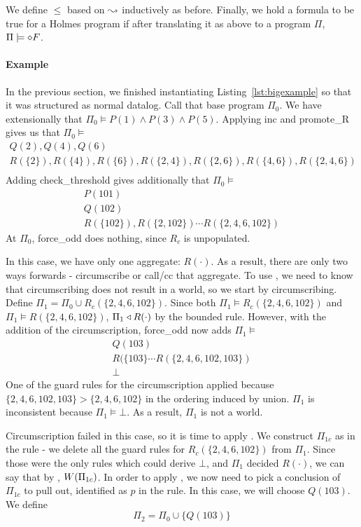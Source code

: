 We define $\leq$ based on $\leadsto$ inductively as before.
Finally, we hold a formula to be true for a Holmes program if after translating it as above to a program $\Pi$, $\Pi \models \diamond F$.

\paragraph{Example}
In the previous section, we finished instantiating Listing~\ref{lst:bigexample} so that it was structured as normal datalog.
Call that base program $\Pi_0$.
We have extensionally that $\Pi_0 \models P(1) \wedge P(3) \wedge P(5)$.
Applying inc and promote\_R gives us that $\Pi_0 \models$
\begin{align*}
	Q(2), Q(4), Q(6)\\
	R(\{2\}), R(\{4\}), R(\{6\}), R(\{2, 4\}), R(\{2, 6\}), R(\{4, 6\}), R(\{2, 4, 6\})\\
\end{align*}
Adding check\_threshold gives additionally that $\Pi_0 \models$
\begin{align*}
	P(101)\\
	Q(102)\\
	R(\{102\}), R(\{2, 102\}) \cdots R(\{2, 4, 6, 102\})
\end{align*}
At $\Pi_0$, force\_odd does nothing, since $R_c$ is unpopulated.

In this case, we have only one aggregate: $R(\cdot)$.
As a result, there are only two ways forwards - circumscribe or call/cc that aggregate.
To use , we need to know that circumscribing does not result in a world, so we start by circumscribing.
Define $\Pi_1 = \Pi_0 \cup R_c(\{2, 4, 6, 102\})$.
Since both $\Pi_1 \models R_c(\{2, 4, 6, 102\})$ and $\Pi_1 \models R(\{2, 4, 6, 102\})$, $\Pi_1 \triangleleft R(\cdot)$ by the bounded rule.
However, with the addition of the circumscription, force\_odd now adds $\Pi_1 \models$
\begin{align*}
	Q(103)\\
	R(\{103\} \cdots R(\{2, 4, 6, 102, 103\})\\
	\bot
\end{align*}
One of the guard rules for the circumscription applied because $\{2, 4, 6, 102, 103\} > \{2, 4, 6, 102\}$ in the ordering induced by union.
$\Pi_1$ is inconsistent because $\Pi_1 \models \bot$.
As a result, $\Pi_1$ is not a world.

Circumscription failed in this case, so it is time to apply .
We construct $\Pi_{1c}$ as in the rule - we delete all the guard rules for $R_c(\{2, 4, 6, 102\})$ from $\Pi_1$.
Since those were the only rules which could derive $\bot$, and $\Pi_1$ decided $R(\cdot)$, we can say that by , $W({\Pi_{1c}})$.
In order to apply , we now need to pick a conclusion of $\Pi_{1c}$ to pull out, identified as $p$ in the rule.
In this case, we will choose $Q(103)$.
We define
\[
	\Pi_2 = \Pi_0 \cup \{Q(103)\}
\]

